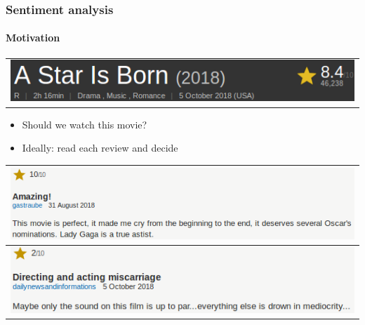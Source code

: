 \documentclass{beamer}
\begin{document}
\begin{frame}
	\frametitle{Sentiment analysis}
	\framesubtitle{Motivation}
	\begin{center}
	\begin{tabular}{c}
		\includegraphics[scale=0.5]{imdb_star} \\
	\end{tabular}
	\end{center}
	\begin{itemize}
		\item Should we watch this movie? \pause
		\item Ideally: read each review and decide
	\end{itemize}
	\begin{center}
	\begin{tabular}{l}
		\includegraphics[scale=0.5]{imdb_review_pos_exag} \pause \\ \hline \hline
		\includegraphics[scale=0.5]{imdb_review_neg}
	\end{tabular}
	\end{center}

\end{frame}

\end{document}

